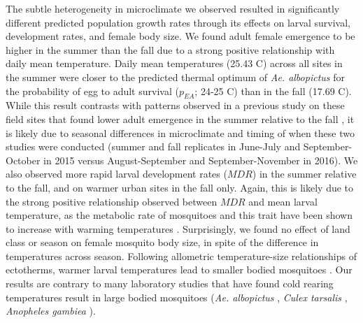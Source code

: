 \documentclass[12pt]{article}
\begin{document}
The subtle heterogeneity in microclimate we observed resulted in significantly different predicted population growth rates through its effects on larval survival, development rates, and female body size. We found adult female emergence to be higher in the summer than the fall due to a strong positive relationship with daily mean temperature. Daily mean temperatures (25.43 \degree C) across all sites in the summer were closer to the predicted thermal optimum of \textit{Ae. albopictus} for the probability of egg to adult survival ($p_{EA}$; 24-25 \degree C) \citep{mordecai2017} than in the fall (17.69 \degree C). While this result contrasts with patterns observed in a previous study on these field sites that found lower adult emergence in the summer relative to the fall \citep{murdock2017}, it is likely due to seasonal differences in microclimate and timing of when these two studies were conducted (summer and fall replicates in June-July and September-October in 2015 versus August-September and September-November in 2016). We also observed more rapid larval development rates ($MDR$) in the summer relative to the fall, and on warmer urban sites in the fall only. Again, this is likely due to the strong positive relationship observed between $MDR$ and  mean larval temperature, as the metabolic rate of mosquitoes and this trait have been shown to increase with warming temperatures \citep{delatte2009,mordecai2017}. Surprisingly, we found no effect of land class or season on female mosquito body size, in spite of the difference in temperatures across season. Following allometric temperature-size relationships of ectotherms, warmer larval temperatures lead to smaller bodied mosquitoes \citep{angilleta2004,kingsolver2008}. Our results are contrary to many laboratory studies that have found cold rearing temperatures result in large bodied mosquitoes (\textit{Ae. albopictus} \citep{reiskind2012a}, \textit{Culex tarsalis} \citep{dodson2012}, \textit{Anopheles gambiea} \citep{koella1996}).
\end{document}
